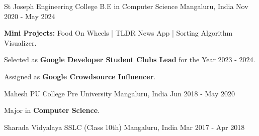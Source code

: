 \begin{cventries}
  \cventry
    {St Joseph Engineering College} %
    {B.E in Computer Science} %
    {Mangaluru, India} %
    {Nov 2020 - May 2024} %
    {
      \begin{cvitems} %
        \item {\textbf{Mini Projects:} Food On Wheels | TLDR News App | Sorting Algorithm Visualizer.}
        \item {Selected as {\bf Google Developer Student Clubs Lead} for the Year 2023 - 2024.}
        \item {Assigned as {\bf Google Crowdsource Influencer}.}
      \end{cvitems}
    }
    
  \cventry
    {Mahesh PU College}
    {Pre University}
    {Mangaluru, India}
    {Jun 2018 - May 2020}
    {
      \begin{cvitems}
        \item {Major in \textbf{Computer Science}.}
      \end{cvitems}
    }
    
  \cventry
    {Sharada Vidyalaya}
    {SSLC (Class 10th)}
    {Mangaluru, India}
    {Mar 2017 - Apr 2018}
    {} %
    \vspace{-\baselineskip}
    \vspace{-\baselineskip}
\end{cventries}
